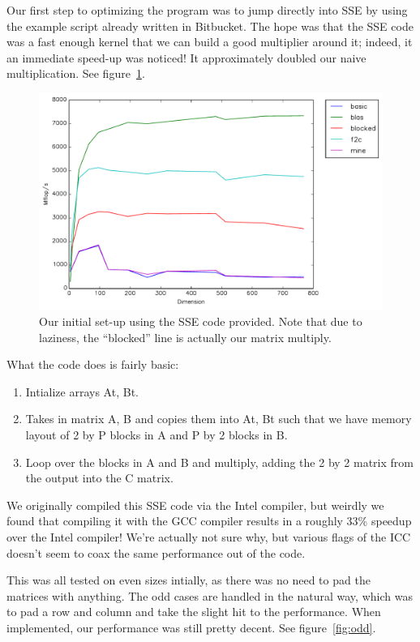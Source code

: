 \documentclass{article}
\begin{document}
  Our first step to optimizing the program was to jump directly into SSE by using the example script already written in Bitbucket.
  The hope was that the SSE code was a fast enough kernel that we can build a good multiplier around it; indeed, it an immediate
  speed-up was noticed! It approximately doubled our naive multiplication. See figure~\ref{fig:initial}.

  \begin{figure}[h]
    \centering
    \includegraphics[width=.7\textwidth]{initial.pdf}
    \caption{Our initial set-up using the SSE code provided. Note that due to laziness, the ``blocked'' line is actually our matrix multiply.}
    \label{fig:initial}
  \end{figure}

  What the code does is fairly basic:
  \begin{enumerate}
    \item Intialize arrays At, Bt.
    \item Takes in matrix A, B and copies them into At, Bt such that we have memory layout of 2 by P blocks in A and P by 2 blocks in B.
    \item Loop over the blocks in A and B and multiply, adding the 2 by 2 matrix from the output into the C matrix.
  \end{enumerate}

  We originally compiled this SSE code via the Intel compiler, but weirdly we found that compiling it with the GCC compiler results in a roughly
  33\% speedup over the Intel compiler! We're actually not sure why, but various flags of the ICC doesn't seem to coax the same performance
  out of the code.

  This was all tested on even sizes intially, as there was no need to pad the matrices with anything. The odd cases
  are handled in the natural way, which was to pad a row and column and take the slight hit to the performance.
  When implemented, our performance was still pretty decent. See figure~\ref{fig:odd}.
\end{document}
